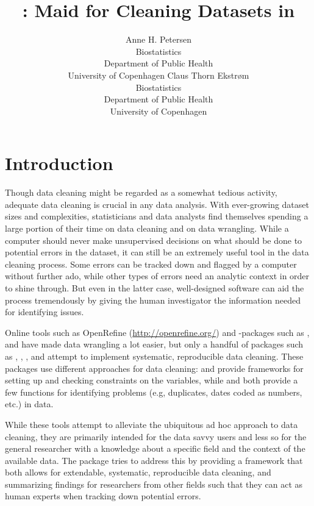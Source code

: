 \documentclass[article,shortnames]{jss}
\author{Anne H. Petersen\\Biostatistics\\Department of Public
  Health\\University of Copenhagen \And Claus Thorn Ekstr\o m\\Biostatistics\\Department of Public
  Health\\University of Copenhagen}
\title{\pkg{cleanR}: Maid for Cleaning Datasets in \proglang{R}}
\begin{document}
\section{Introduction}
Though data cleaning might be regarded as a somewhat tedious activity,
adequate data cleaning is crucial in any data analysis. With
ever-growing dataset sizes and complexities, statisticians and data
analysts find themselves spending a large portion of their time on
data cleaning and on data wrangling. While a computer should never
make unsupervised decisions on what should be done to potential
errors in the dataset, it can still be an extremely useful tool in the 
data cleaning process. Some errors can be tracked down and flagged by a 
computer without further ado, while other types of errors need an analytic
context in order to shine through. But even in the latter case, well-designed
software can aid the process tremendously by giving the human investigator the 
information needed for identifying issues. 

Online tools such as OpenRefine (\url{http://openrefine.org/}) and
-packages such as , and  have
made data wrangling a lot easier, but only a handful of packages such
as , , , and
 attempt to implement systematic, reproducible data
cleaning.  These packages use different approaches for data cleaning:
 and  provide frameworks for setting up
and checking constraints on the variables, while  and
 both provide a few functions for identifying problems
(e.g, duplicates, dates coded as numbers, etc.) in data.

While these tools attempt to alleviate the ubiquitous ad hoc approach
to data cleaning, they are primarily intended for the data savvy users
and less so for the general researcher with a knowledge about a specific
field and the context of the available data. The  package
tries to address this by providing a framework that both allows for
extendable, systematic, reproducible data cleaning, and summarizing
findings for researchers from other fields such that they can act as
human experts when tracking down potential errors. 

\end{document}
